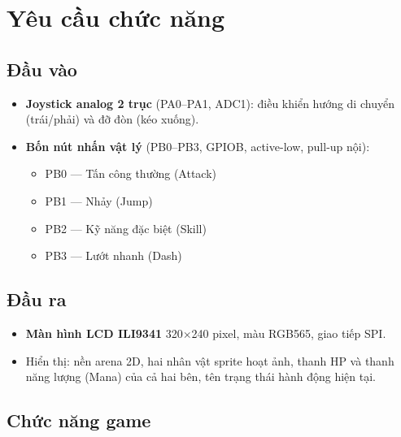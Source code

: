 \documentclass[a4paper,12pt]{report}
\begin{document}
\section{Yêu cầu chức năng}

\subsection{Đầu vào}
\begin{itemize}
    \item \textbf{Joystick analog 2 trục} (PA0--PA1, ADC1): điều khiển hướng di chuyển (trái/phải) và đỡ đòn (kéo xuống).
    \item \textbf{Bốn nút nhấn vật lý} (PB0--PB3, GPIOB, active-low, pull-up nội):
    \begin{itemize}
        \item PB0 --- Tấn công thường (Attack)
        \item PB1 --- Nhảy (Jump)
        \item PB2 --- Kỹ năng đặc biệt (Skill)
        \item PB3 --- Lướt nhanh (Dash)
    \end{itemize}
\end{itemize}

\subsection{Đầu ra}
\begin{itemize}
    \item \textbf{Màn hình LCD ILI9341} 320$\times$240 pixel, màu RGB565, giao tiếp SPI.
    \item Hiển thị: nền arena 2D, hai nhân vật sprite hoạt ảnh, thanh HP và thanh năng lượng (Mana) của cả hai bên, tên trạng thái hành động hiện tại.
\end{itemize}

\subsection{Chức năng game}
\end{document}
